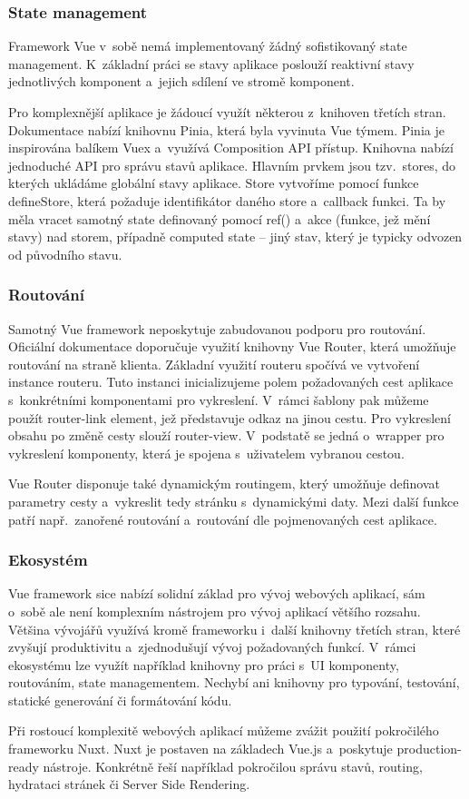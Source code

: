 \subsubsection{State management}

Framework Vue v~sobě nemá implementovaný žádný sofistikovaný state management. 
K~základní práci se stavy aplikace poslouží reaktivní stavy jednotlivých komponent a~jejich sdílení ve stromě komponent.

Pro komplexnější aplikace je žádoucí využít některou z~knihoven třetích stran. Dokumentace nabízí knihovnu Pinia, která byla vyvinuta Vue týmem. 
Pinia je inspirována balíkem Vuex a~využívá Composition API přístup. Knihovna nabízí jednoduché API pro správu stavů aplikace. 
Hlavním prvkem jsou tzv.~stores, do kterých ukládáme globální stavy aplikace. 
Store vytvoříme pomocí funkce defineStore, která požaduje identifikátor daného store a~callback funkci. 
Ta by měla vracet samotný state definovaný pomocí ref() a~akce (funkce, jež mění stavy) nad storem, případně computed state -- jiný stav, který je typicky odvozen od původního stavu.\cite{pinia,vue}

\subsubsection{Routování}

Samotný Vue framework neposkytuje zabudovanou podporu pro routování. Oficiální dokumentace doporučuje využití knihovny Vue Router, která umožňuje routování na straně klienta. 
Základní využití routeru spočívá ve vytvoření instance routeru. Tuto instanci inicializujeme polem požadovaných cest aplikace s~konkrétními komponentami pro vykreslení. 
V~rámci šablony pak můžeme použít router-link element, jež představuje odkaz na jinou cestu. Pro vykreslení obsahu po změně cesty slouží router-view. 
V~podstatě se jedná o~wrapper pro vykreslení komponenty, která je spojena s~uživatelem vybranou cestou.

Vue Router disponuje také dynamickým routingem, který umožňuje definovat parametry cesty a~vykreslit tedy stránku s~dynamickými daty. 
Mezi další funkce patří např.~zanořené routování a~routování dle pojmenovaných cest aplikace.\cite{vue,vuerouter}

\subsubsection{Ekosystém}

Vue framework sice nabízí solidní základ pro vývoj webových aplikací, sám o~sobě ale není komplexním nástrojem pro vývoj aplikací většího rozsahu. 
Většina vývojářů využívá kromě frameworku i~další knihovny třetích stran, které zvyšují produktivitu a~zjednodušují vývoj požadovaných funkcí. 
V~rámci ekosystému lze využít například knihovny pro práci s~UI komponenty, routováním, state managementem. 
Nechybí ani knihovny pro typování, testování, statické generování či formátování kódu.

Při rostoucí komplexitě webových aplikací můžeme zvážit použití pokročilého frameworku Nuxt. Nuxt je postaven na základech Vue.js a~poskytuje production-ready nástroje. 
Konkrétně řeší například pokročilou správu stavů, routing, hydrataci stránek či Server Side Rendering.\cite{awesomevue,vue}